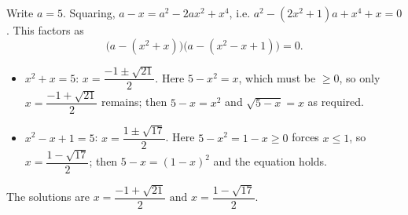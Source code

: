 Write $a=5$. Squaring, $a-x=a^2-2ax^2+x^4$, i.e. $a^2-(2x^2+1)a+x^4+x=0$. This factors as
\[\bigl(a-(x^2+x)\bigr)\bigl(a-(x^2-x+1)\bigr)=0.\]
\begin{itemize}
\item $x^2+x=5$: $x=\dfrac{-1\pm\sqrt{21}}2$. Here $5-x^2=x$, which must be $\ge0$, so only $x=\dfrac{-1+\sqrt{21}}2$ remains; then $5-x=x^2$ and $\sqrt{5-x}=x$ as required.
\item $x^2-x+1=5$: $x=\dfrac{1\pm\sqrt{17}}2$. Here $5-x^2=1-x\ge0$ forces $x\le1$, so $x=\dfrac{1-\sqrt{17}}2$; then $5-x=(1-x)^2$ and the equation holds.
\end{itemize}
The solutions are $\boxed{x=\dfrac{-1+\sqrt{21}}2\text{ and }x=\dfrac{1-\sqrt{17}}2}$.
